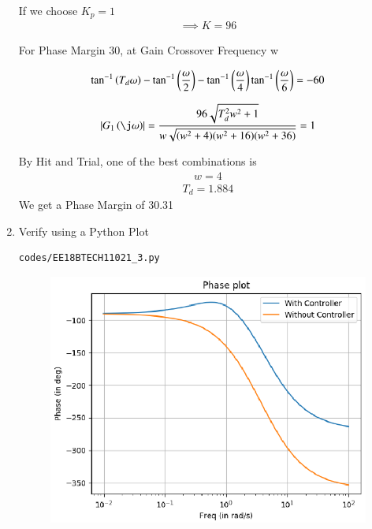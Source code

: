 \begin{enumerate}[label=\thesection.\arabic*.,ref=\thesection.\theenumi]
If we choose $K_{p} = 1$
\begin{align}
    \implies K = 96
\end{align}

For Phase Margin 30\degree, at Gain Crossover Frequency w

\begin{align}
    \tan^{-1}\left(T_{d}\omega\right) - \tan^{-1}\left(\frac{\omega}{2}\right) - \tan^{-1}\left(\frac{\omega}{4}\right)
    \tan^{-1}\left(\frac{\omega}{6}\right) = -60
\end{align}

\begin{align}
    \abs{G_{1}\brak{\j\omega}} = \frac{96\sqrt{T_{d}^2w^2 + 1}}{w\sqrt{(w^2+4)(w^2 + 16)(w^2 + 36)}} = 1
\end{align}

By Hit and Trial, one of the best combinations is
\begin{align}
    w = 4
\end{align}
\begin{align}
    T_{d} = 1.884
\end{align}
We get a Phase Margin of 30.31\degree

\item
Verify using a Python Plot

\solution
\begin{lstlisting}
codes/EE18BTECH11021_3.py
\end{lstlisting}

\begin{figure}
\centering
\includegraphics[width=\columnwidth]{figs/EE18BTECH11021_PD.eps}
\end{figure}


\end{enumerate}
